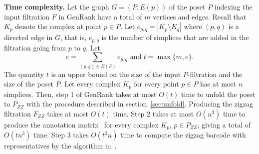 \documentclass[11pt]{article}
\theoremstyle{plain}%
\newtheorem{proposition}{Proposition}[section]
\newcommand{\Int}{\mathbb{I}}
\begin{document}
\vspace{0.1in}
\noindent
{\bf Time complexity.}
Let the graph $G=(P,E(p))$ of the poset $P$ indexing the input filtration $F$ in {\sc GenRank}
have a total of $m$ vertices and edges. 
Recall that $K_p$ denote the complex at point $p\in P$. Let $e_{p,q}=|K_{p}\setminus K_{q}|$ where
$(p, q)$ is a directed edge in $G$, that is, $e_{p,q}$ is the number of simplices
that are added in the filtration going from $p$ to $q$. Let 
\begin{equation}
e=\sum_{(p, q)\in E(P)}e_{p,q} \mbox{ and } t=\max\{m,e\}.
\label{eq:tdef}
\end{equation}
The quantity $t$ is an upper bound on the size of the input
$P$-filtration and the size of the poset $P$.
Let every complex $K_p$ for every
point $p\in P$ has at most $n$ simplices. Then, step 1 of {\sc GenRank}
takes at most $O(t)$ time to unfold the poset to $P_{ZZ}$ with the procedure
described in section~\ref{sec:unfold}. Producing the zigzag filtration $F_{ZZ}$
takes at most $O(t)$ time. Step 2 takes at most $O(n^3)$ time to produce
the annotation matrix~\cite{DW22} for every complex $K_p$, $p\in P_{ZZ}$, giving a total
of $O(tn^3)$ time. Step 3 takes $O(t^2n)$ time to compute the zigzag barcode
with representatives by the algorithm in~\cite{DHM25}.
\end{document}
